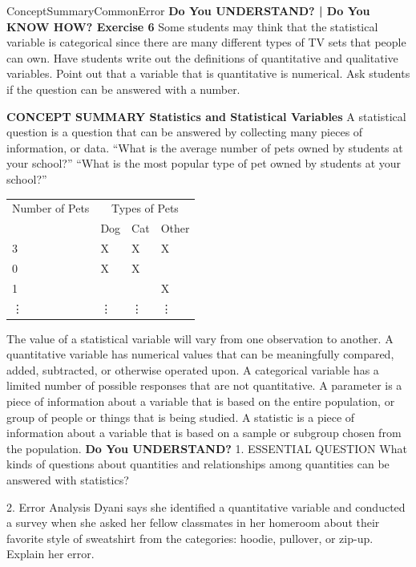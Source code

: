 \documentclass{article}
\newenvironment{concept-summary}{}{}    %
\newenvironment{te-addendum}[2]{}{}     %
\newcommand{\answer}[1]{}               %
\newcommand{\te}[1]{}                   %
\begin{document}
\begin{te-addendum}{ConceptSummary}{CommonError}
\textbf{Do You UNDERSTAND? | Do You KNOW HOW? Exercise 6}
Some students may think that the statistical variable is categorical since there are many different types of TV sets that people can own. Have students write out the definitions of quantitative and qualitative variables. Point out that a variable that is quantitative is numerical. Ask students if the question can be answered with a number.
\end{te-addendum}
\begin{concept-summary}
\textbf{CONCEPT SUMMARY Statistics and Statistical Variables}
A statistical question is a question that can be answered by collecting many pieces of information, or data.
``What is the average number of pets owned by students at your school?''
``What is the most popular type of pet owned by students at your school?''
\begin{tabular}{llll}
Number of Pets & \multicolumn{3}{c}{Types of Pets} \\
 & Dog & Cat & Other \\
3 & X & X & X \\
0 & X & X & \\
1 & & & X \\
\vdots & \vdots & \vdots & \vdots \\
\end{tabular}
\te{Printed 0 in the row with Dog and Cat marked; likely 2.}
The value of a statistical variable will vary from one observation to another.
A quantitative variable has numerical values that can be meaningfully compared, added, subtracted, or otherwise operated upon.
A categorical variable has a limited number of possible responses that are not quantitative.
A parameter is a piece of information about a variable that is based on the entire population, or group of people or things that is being studied.
A statistic is a piece of information about a variable that is based on a sample or subgroup chosen from the population.
\textbf{Do You UNDERSTAND?}
1. ESSENTIAL QUESTION What kinds of questions about quantities and relationships among quantities can be answered with statistics?
\answer{Statistics can be used to study variables among entire populations, or groups (samples) within the populations, that can pertain to qualities or quantities.}
2. Error Analysis Dyani says she identified a quantitative variable and conducted a survey when she asked her fellow classmates in her homeroom about their favorite style of sweatshirt from the categories: hoodie, pullover, or zip-up. Explain her error.

\end{concept-summary}
\end{document}
